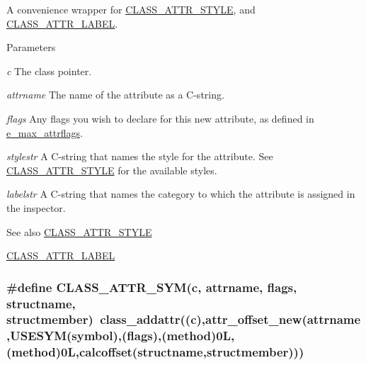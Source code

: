 A convenience wrapper for \hyperlink{group__attr_ga16521ec1560a294041e78dacf6f8e4ee}{CLASS\_\-ATTR\_\-STYLE}, and \hyperlink{group__attr_gad46aeee11e8b4786332ce4ff43963326}{CLASS\_\-ATTR\_\-LABEL}. 
\begin{DoxyParams}{Parameters}
\item[{\em c}]The class pointer. \item[{\em attrname}]The name of the attribute as a C-\/string. \item[{\em flags}]Any flags you wish to declare for this new attribute, as defined in \hyperlink{group__attr_gaf296cfc6741bb19207f6ed8062809115}{e\_\-max\_\-attrflags}. \item[{\em stylestr}]A C-\/string that names the style for the attribute. See \hyperlink{group__attr_ga16521ec1560a294041e78dacf6f8e4ee}{CLASS\_\-ATTR\_\-STYLE} for the available styles. \item[{\em labelstr}]A C-\/string that names the category to which the attribute is assigned in the inspector.\end{DoxyParams}
\begin{DoxySeeAlso}{See also}
\hyperlink{group__attr_ga16521ec1560a294041e78dacf6f8e4ee}{CLASS\_\-ATTR\_\-STYLE} 

\hyperlink{group__attr_gad46aeee11e8b4786332ce4ff43963326}{CLASS\_\-ATTR\_\-LABEL} 
\end{DoxySeeAlso}
\hypertarget{group__attr_gaef468ae67347721c1fd8bc7b54c89845}{
\subsubsection[{CLASS\_\-ATTR\_\-SYM}]{\setlength{\rightskip}{0pt plus 5cm}\#define CLASS\_\-ATTR\_\-SYM(c, \/  attrname, \/  flags, \/  structname, \/  structmember)~class\_\-addattr((c),attr\_\-offset\_\-new(attrname,USESYM(symbol),(flags),({\bf method})0L,(method)0L,calcoffset(structname,structmember)))}}
\label{group__attr_gaef468ae67347721c1fd8bc7b54c89845}


